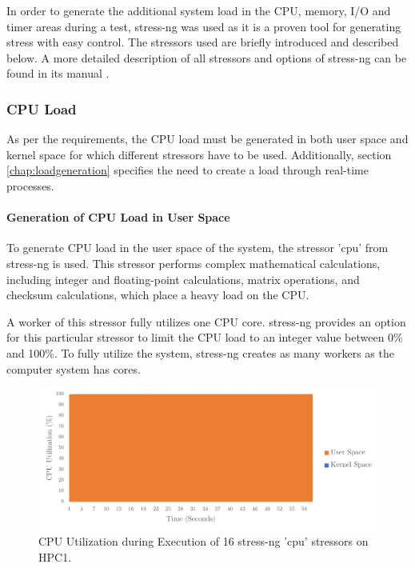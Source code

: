 In order to generate the additional system load in the CPU, memory, I/O and timer areas during a test, stress-ng was used as it is a proven tool for generating stress with easy control. The stressors used are briefly introduced and described below. A more detailed description of all stressors and options of stress-ng can be found in its manual \cite{stress03}.

\subsubsection{CPU Load} \label{chap:stressngCPU}
As per the requirements, the CPU load must be generated in both user space and kernel space for which different stressors have to be used. Additionally, section \ref{chap:loadgeneration} specifies the need to create a load through real-time processes.

\paragraph{Generation of CPU Load in User Space} \label{chap:CPUStressor}
To generate CPU load in the user space of the system, the stressor 'cpu' from stress-ng is used. This stressor performs complex mathematical calculations, including integer and floating-point calculations, matrix operations, and checksum calculations, which place a heavy load on the CPU.

A worker of this stressor fully utilizes one CPU core. stress-ng provides an option for this particular stressor to limit the CPU load to an integer value between 0\% and 100\%. To fully utilize the system, stress-ng creates as many workers as the computer system has cores.

\begin{figure}[h!]
    \centering
    \includegraphics[width=1\linewidth]{figures/method/stress1.pdf}
    \caption{CPU Utilization during Execution of 16 stress-ng 'cpu' stressors on HPC1.}
    \label{fig:stressCPU}
\end{figure}

